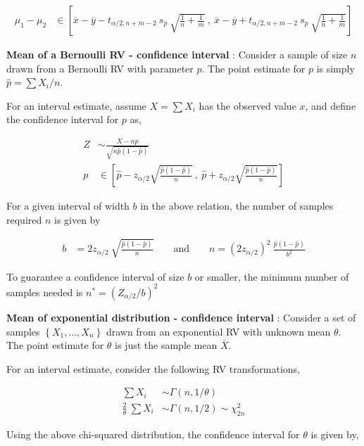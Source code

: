 \begin{align}
	\mu_1 - \mu_2 &\in \left[ \overline{x} - \overline{y} - t_{\alpha / 2, n+m-2}\ s_p\ \sqrt{\frac{1}{n} + \frac{1}{m}}\ ,\ \overline{x} - \overline{y} + t_{\alpha / 2, n+m-2}\ s_p\ \sqrt{\frac{1}{n} + \frac{1}{m}} \right] 
\end{align}

\textbf{Mean of a Bernoulli RV - confidence interval} : Consider a sample of size $ n $ drawn from a Bernoulli RV with parameter $ p $. The point estimate for $ p $ is simply $ \widehat{p} = \sum X_i / n $.

For an interval estimate, assume $ X = \sum X_i $ has the observed value $ x $, and define the confidence interval for $ p $ as,

\begin{align}
	Z &\sim \frac{X - np}{\sqrt{n \widehat{p} (1 - \widehat{p})}} \nonumber \\
	p &\in \left[ \widehat{p} - z_{\alpha/2}\sqrt{\frac{\widehat{p}(1-\widehat{p})}{n}}\ ,\ \widehat{p} + z_{\alpha/2}\sqrt{\frac{\widehat{p}(1-\widehat{p})}{n}}  \right]
\end{align}

For a given interval of width $ b $ in the above relation, the number of samples required $ n $ is given by

\begin{align}
	b &= 2 z_{\alpha/2}\ \sqrt{\frac{\widehat{p}(1-\widehat{p})}{n}} \qquad \text{and} \qquad n = (2z_{\alpha/2})^2\  \frac{\widehat{p}(1-\widehat{p})}{b^2}
\end{align}

To guarantee a confidence interval of size $ b $ or smaller, the minimum number of samples needed is $ n^* = (Z_{\alpha/2} / b)^2 $ 

\textbf{Mean of exponential distribution - confidence interval} : Consider a set of samples $ \left\{X_1, \dots, X_n\right\} $ drawn from an exponential RV with unknown mean $ \theta $. The point estimate for $ \theta $ is just the sample mean $ \overline{X} $.

For an interval estimate, consider the following RV transformations,

\begin{align}
	\sum X_i &\sim \Gamma(n, 1/\theta) \nonumber \\
	\frac{2}{\theta}\ \sum X_i &\sim \Gamma(n, 1/2) \sim \chi^2_{2n}
\end{align}

Using the above chi-squared distribution, the confidence interval for $ \theta $ is given by,


